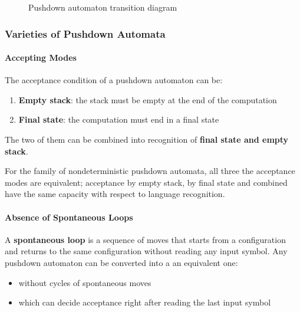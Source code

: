 \documentclass[english]{article}
\begin{document}
\begin{figure}[htbp]
  \centering
  \bigskip
  \caption{Pushdown automaton transition diagram}
  \label{fig:pushdown-automaton-transition-diagram}
  \bigskip
\end{figure}

\subsubsection{Varieties of Pushdown Automata}

\paragraph{Accepting Modes}

The acceptance condition of a pushdown automaton can be:

\begin{enumerate}
  \item \textbf{Empty stack}: the stack must be empty at the end of the computation
  \item \textbf{Final state}: the computation must end in a final state
\end{enumerate}

The two of them can be combined into recognition of \textbf{final state and empty stack}.

For the family of nondeterministic pushdown automata, all three the acceptance modes are equivalent;
acceptance by empty stack, by final state and combined
have the same capacity with respect to language recognition.

\paragraph{Absence of Spontaneous Loops}

A \textbf{spontaneous loop} is a sequence of moves that starts from a configuration and returns to the same configuration without reading any input symbol.
Any pushdown automaton can be converted into a an equivalent one:

\begin{itemize}
  \item without cycles of spontaneous moves
  \item which can decide acceptance right after reading the last input symbol
\end{itemize}
\end{document}
